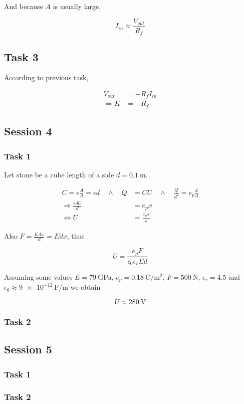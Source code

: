 \documentclass[12pt]{article}
\begin{document}
And because $A$ is usually large,

\begin{equation*}
I_{in} \approx \frac{V_{out}}{R_f}
\end{equation*}

\subsection{Task 3}
According to previous task,

\begin{align*}
V_{out} &= -R_f I_{in} \\
\Rightarrow K &= -R_f
\end{align*}

\subsection{Session 4}

\subsubsection{Task 1}

Let stone be a cube length of a side $d = \SI{0.1}{\metre}$.

\begin{align*}
C = \epsilon \frac{A}{d} = \epsilon d \quad \wedge \quad Q &= CU \quad \wedge \quad \frac{Q}{d^2} = e_p \frac{x}{d} \\
\Rightarrow \frac{\epsilon d U}{d} &= e_p x \\
\Leftrightarrow U &= \frac{e_p x}{\epsilon}
\end{align*}

Also $F = \frac{EAx}{d} = Edx$, thus

\begin{equation*}
U = \frac{e_p F}{\epsilon_0 \epsilon_r E d}
\end{equation*}

Assuming some values $E = \SI{79}{\giga\pascal}$, $e_p = \SI{0.18}{\coulomb\per\square\meter}$, $F = \SI{500}{\newton}$, $\epsilon_r = 4.5$ and $\epsilon_0 \approx \SI{9e-12}{\farad\per\meter}$ we obtain

\begin{equation*}
U \approx \SI{280}{\volt}
\end{equation*}


\subsubsection{Task 2}

\subsection{Session 5}

\subsubsection{Task 1}

\subsubsection{Task 2}
\end{document}
